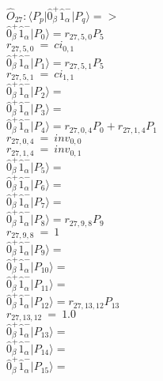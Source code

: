 \documentclass[14pt]{article}
\begin{document}
    $\hat{O}_{27}:  \langle{P_p}\vert \hat{0}_{\beta}^{+}\hat{1}_{\alpha}^{-} \vert{P_q}\rangle => $ \\ 
    $ \hat{0}_{\beta}^{+}\hat{1}_{\alpha}^{-} \vert{P_{0}}\rangle = {r}_{27,5,0}P_{5} $ \\ 
    ${r}_{27,5,0}\ =\ {ci}_{0,1} $ \\ 
    $ \hat{0}_{\beta}^{+}\hat{1}_{\alpha}^{-} \vert{P_{1}}\rangle = {r}_{27,5,1}P_{5} $ \\ 
    ${r}_{27,5,1}\ =\ {ci}_{1,1} $ \\ 
    $ \hat{0}_{\beta}^{+}\hat{1}_{\alpha}^{-} \vert{P_{2}}\rangle =  $ \\ 
    $ \hat{0}_{\beta}^{+}\hat{1}_{\alpha}^{-} \vert{P_{3}}\rangle =  $ \\ 
    $ \hat{0}_{\beta}^{+}\hat{1}_{\alpha}^{-} \vert{P_{4}}\rangle = {r}_{27,0,4}P_{0}+{r}_{27,1,4}P_{1} $ \\ 
    ${r}_{27,0,4}\ =\ {inv}_{0,0} $ \\ 
    ${r}_{27,1,4}\ =\ {inv}_{0,1} $ \\ 
    $ \hat{0}_{\beta}^{+}\hat{1}_{\alpha}^{-} \vert{P_{5}}\rangle =  $ \\ 
    $ \hat{0}_{\beta}^{+}\hat{1}_{\alpha}^{-} \vert{P_{6}}\rangle =  $ \\ 
    $ \hat{0}_{\beta}^{+}\hat{1}_{\alpha}^{-} \vert{P_{7}}\rangle =  $ \\ 
    $ \hat{0}_{\beta}^{+}\hat{1}_{\alpha}^{-} \vert{P_{8}}\rangle = {r}_{27,9,8}P_{9} $ \\ 
    ${r}_{27,9,8}\ =\ 1 $ \\ 
    $ \hat{0}_{\beta}^{+}\hat{1}_{\alpha}^{-} \vert{P_{9}}\rangle =  $ \\ 
    $ \hat{0}_{\beta}^{+}\hat{1}_{\alpha}^{-} \vert{P_{10}}\rangle =  $ \\ 
    $ \hat{0}_{\beta}^{+}\hat{1}_{\alpha}^{-} \vert{P_{11}}\rangle =  $ \\ 
    $ \hat{0}_{\beta}^{+}\hat{1}_{\alpha}^{-} \vert{P_{12}}\rangle = {r}_{27,13,12}P_{13} $ \\ 
    ${r}_{27,13,12}\ =\ 1.0 $ \\ 
    $ \hat{0}_{\beta}^{+}\hat{1}_{\alpha}^{-} \vert{P_{13}}\rangle =  $ \\ 
    $ \hat{0}_{\beta}^{+}\hat{1}_{\alpha}^{-} \vert{P_{14}}\rangle =  $ \\ 
    $ \hat{0}_{\beta}^{+}\hat{1}_{\alpha}^{-} \vert{P_{15}}\rangle =  $ \\ 
    
\end{document}
